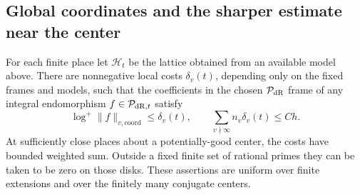 \subsection{Global coordinates and the sharper estimate near the center}

\begin{lemma}\label{ht:frame-costs}
For each finite place let $\mathscr H_t$ be the lattice obtained from
an available model above. There are nonnegative local costs
$\delta_v(t)$, depending only on the fixed frames and models, such
that the coefficients in the chosen $\mathcal P_{\rm dR}$ frame of any
integral endomorphism $f\in\mathcal P_{{\rm dR},t}$ satisfy
\begin{equation}\label{ht:finite-frame-bound}
 \log^+\|f\|_{v,\mathrm{coord}}\leq\delta_v(t),
 \qquad
 \sum_{v\nmid\infty}n_v\delta_v(t)\leq Ch.
\end{equation}
At sufficiently close places about a potentially-good center, the
costs have bounded weighted sum. Outside a fixed finite set of rational
primes they can be taken to be zero on those disks. These assertions
are uniform over finite extensions and over the finitely many
conjugate centers.
\end{lemma}

